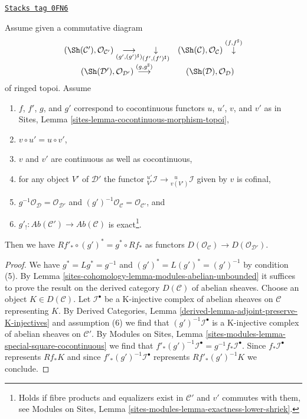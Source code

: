 \begin{lemma}
\label{sites-cohomology-lemma-special-square-cocontinuous}
\href{https://stacks.math.columbia.edu/tag/0FN6}{\texttt{Stacks tag 0FN6}}

Assume given a commutative diagram
$$
\begin{array}{cc}(\Sh(\mathcal{C}'), \mathcal{O}_{\mathcal{C}'})
\underset{(g', (g')^\sharp)}{\longrightarrow}\underset{(f', (f')^\sharp)}{\downarrow} & (\Sh(\mathcal{C}), \mathcal{O}_\mathcal{C}) \overset{(f, f^\sharp)}{\downarrow} \\ (\Sh(\mathcal{D}'), \mathcal{O}_{\mathcal{D}'}) \overset{(g, g^\sharp)}{\longrightarrow} & (\Sh(\mathcal{D}), \mathcal{O}_\mathcal{D})\end{array}
$$
of ringed topoi. Assume
\begin{enumerate}
\item $f$, $f'$, $g$, and $g'$ correspond to cocontinuous functors
$u$, $u'$, $v$, and $v'$ as in
Sites, Lemma \ref{sites-lemma-cocontinuous-morphism-topoi},
\item $v \circ u' = u \circ v'$,
\item $v$ and $v'$ are continuous as well as cocontinuous,
\item for any object $V'$ of $\mathcal{D}'$ the functor
${}^{u'}_{V'}\mathcal{I} \to {}^{\ \ \ u}_{v(V')}\mathcal{I}$
given by $v$ is cofinal,
\item $g^{-1}\mathcal{O}_{\mathcal{D}} = \mathcal{O}_{\mathcal{D}'}$
and $(g')^{-1}\mathcal{O}_{\mathcal{C}} = \mathcal{O}_{\mathcal{C}'}$, and
\item $g'_! : \textit{Ab}(\mathcal{C}') \to \textit{Ab}(\mathcal{C})$
is exact\footnote{Holds if fibre products and equalizers exist in
$\mathcal{C}'$ and $v'$ commutes with them, see
Modules on Sites, Lemma \ref{sites-modules-lemma-exactness-lower-shriek}.}.
\end{enumerate}
Then we have $Rf'_* \circ (g')^* = g^* \circ Rf_*$ as functors
$D(\mathcal{O}_\mathcal{C}) \to D(\mathcal{O}_{\mathcal{D}'})$.
\end{lemma}

\begin{proof}
We have $g^* = Lg^* = g^{-1}$ and $(g')^* = L(g')^* = (g')^{-1}$
by condition (5).
By Lemma \ref{sites-cohomology-lemma-modules-abelian-unbounded} it suffices
to prove the result on the derived category $D(\mathcal{C})$
of abelian sheaves. Choose an object $K \in D(\mathcal{C})$.
Let $\mathcal{I}^\bullet$ be a K-injective complex of abelian
sheaves on $\mathcal{C}$ representing $K$. By
Derived Categories, Lemma \ref{derived-lemma-adjoint-preserve-K-injectives}
and assumption (6) we find that $(g')^{-1}\mathcal{I}^\bullet$
is a K-injective complex of abelian sheaves on $\mathcal{C}'$.
By Modules on Sites, Lemma
\ref{sites-modules-lemma-special-square-cocontinuous}
we find that $f'_*(g')^{-1}\mathcal{I}^\bullet = g^{-1}f_*\mathcal{I}^\bullet$.
Since $f_*\mathcal{I}^\bullet$ represents $Rf_*K$ and since
$f'_*(g')^{-1}\mathcal{I}^\bullet$ represents $Rf'_*(g')^{-1}K$
we conclude.
\end{proof}

